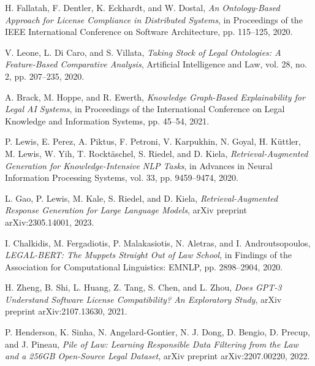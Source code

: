 \documentclass[12pt]{article}
\begin{document}
\begin{thebibliography}{15}
H. Fallatah, F. Dentler, K. Eckhardt, and W. Dostal,
\textit{An Ontology-Based Approach for License Compliance in Distributed Systems},
in Proceedings of the IEEE International Conference on Software Architecture,
pp. 115--125, 2020.

V. Leone, L. Di Caro, and S. Villata,
\textit{Taking Stock of Legal Ontologies: A Feature-Based Comparative Analysis},
Artificial Intelligence and Law, vol. 28, no. 2, pp. 207--235, 2020.

A. Brack, M. Hoppe, and R. Ewerth,
\textit{Knowledge Graph-Based Explainability for Legal AI Systems},
in Proceedings of the International Conference on Legal Knowledge and Information Systems,
pp. 45--54, 2021.

P. Lewis, E. Perez, A. Piktus, F. Petroni, V. Karpukhin, N. Goyal, H. Küttler, M. Lewis, W. Yih, T. Rocktäschel, S. Riedel, and D. Kiela,
\textit{Retrieval-Augmented Generation for Knowledge-Intensive NLP Tasks},
in Advances in Neural Information Processing Systems,
vol. 33, pp. 9459--9474, 2020.

L. Gao, P. Lewis, M. Kale, S. Riedel, and D. Kiela,
\textit{Retrieval-Augmented Response Generation for Large Language Models},
arXiv preprint arXiv:2305.14001, 2023.

I. Chalkidis, M. Fergadiotis, P. Malakasiotis, N. Aletras, and I. Androutsopoulos,
\textit{LEGAL-BERT: The Muppets Straight Out of Law School},
in Findings of the Association for Computational Linguistics: EMNLP,
pp. 2898--2904, 2020.

H. Zheng, B. Shi, L. Huang, Z. Tang, S. Chen, and L. Zhou,
\textit{Does GPT-3 Understand Software License Compatibility? An Exploratory Study},
arXiv preprint arXiv:2107.13630, 2021.

P. Henderson, K. Sinha, N. Angelard-Gontier, N. J. Dong, D. Bengio, D. Precup, and J. Pineau,
\textit{Pile of Law: Learning Responsible Data Filtering from the Law and a 256GB Open-Source Legal Dataset},
arXiv preprint arXiv:2207.00220, 2022.

\end{thebibliography}
\end{document}
